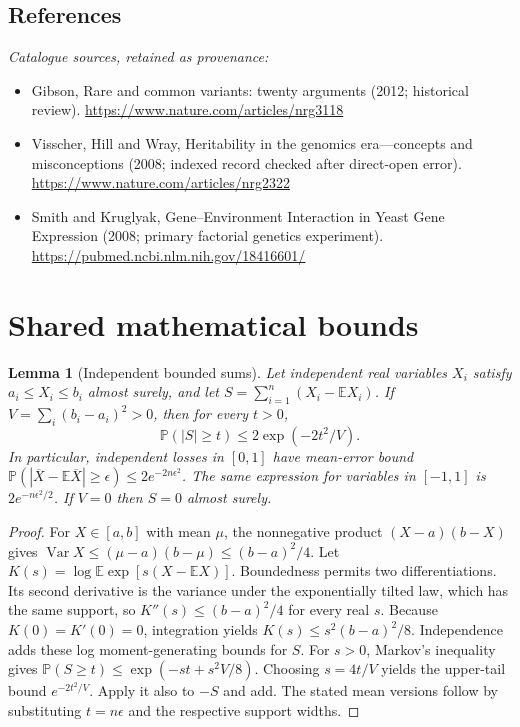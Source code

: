 \documentclass[11pt]{article}
\newcommand{\E}{\mathbb E}
\newcommand{\Prob}{\mathbb P}
\DeclareMathOperator{\Var}{Var}
\providecommand{\E}{\mathbb E}
\providecommand{\Prob}{\mathbb P}
\providecommand{\Var}{\operatorname{Var}}
\newtheorem{sharedlemma}{Lemma}[section]
\begin{document}
\subsection{References}
\noindent\emph{Catalogue sources, retained as provenance:}
\begin{itemize}
\item Gibson, Rare and common variants: twenty arguments (2012; historical review). \url{https://www.nature.com/articles/nrg3118}
\item Visscher, Hill and Wray, Heritability in the genomics era---concepts and misconceptions (2008; indexed record checked after direct-open error). \url{https://www.nature.com/articles/nrg2322}
\item Smith and Kruglyak, Gene--Environment Interaction in Yeast Gene Expression (2008; primary factorial genetics experiment). \url{https://pubmed.ncbi.nlm.nih.gov/18416601/}
\end{itemize}
\clearpage


\appendix
\section{Shared mathematical bounds}\label{app:bounds}
\begin{sharedlemma}[Independent bounded sums]\label{lem:bounded}
Let independent real variables $X_i$ satisfy $a_i\leq X_i\leq b_i$ almost surely,
and let $S=\sum_{i=1}^n(X_i-\E X_i)$. If
$V=\sum_i(b_i-a_i)^2>0$, then for every $t>0$,
\[
 \Prob(|S|\geq t)\leq 2\exp(-2t^2/V).
\]
In particular, independent losses in $[0,1]$ have mean-error bound
$\Prob(|\overline X-\E\overline X|\geq\epsilon)
\leq2e^{-2n\epsilon^2}$. The same expression for variables in $[-1,1]$
is $2e^{-n\epsilon^2/2}$. If $V=0$ then $S=0$ almost surely.
\end{sharedlemma}
\begin{proof}
For $X\in[a,b]$ with mean $\mu$, the nonnegative product
$(X-a)(b-X)$ gives
$\Var X\leq(\mu-a)(b-\mu)\leq(b-a)^2/4$.
Let $K(s)=\log\E\exp[s(X-\E X)]$.
Boundedness permits two differentiations. Its second derivative is the variance
under the exponentially tilted law, which has the same support, so
$K''(s)\leq(b-a)^2/4$ for every real $s$.
Because $K(0)=K'(0)=0$, integration yields
$K(s)\leq s^2(b-a)^2/8$.
Independence adds these log moment-generating bounds for $S$.
For $s>0$, Markov's inequality gives
$\Prob(S\geq t)\leq\exp(-st+s^2V/8)$.
Choosing $s=4t/V$ yields the upper-tail bound $e^{-2t^2/V}$.
Apply it also to $-S$ and add. The stated mean versions follow by substituting
$t=n\epsilon$ and the respective support widths.
\end{proof}
\end{document}
